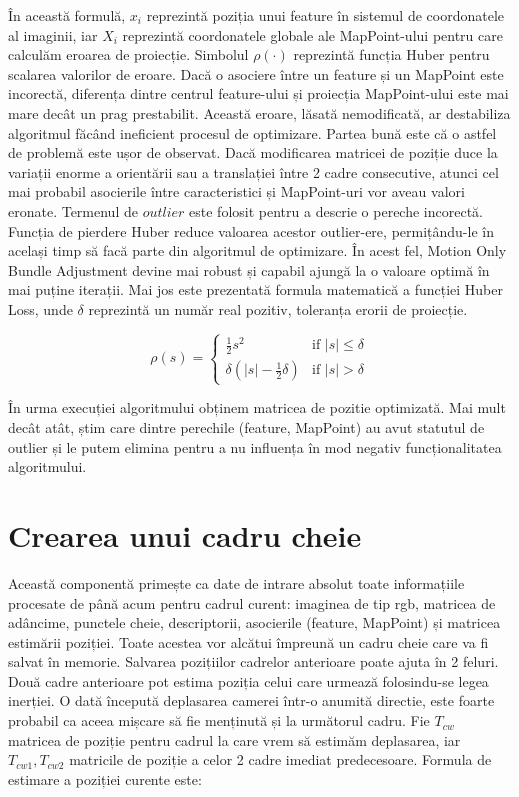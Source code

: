 \documentclass[12pt,a4paper]{report}
\begin{document}
În această formulă, \(x_i\) reprezintă poziția unui feature în sistemul de 
coordonatele al imaginii, iar \(X_i\) reprezintă coordonatele globale ale MapPoint-ului pentru care calculăm eroarea
de proiecție. Simbolul $ \rho(\cdot) $ reprezintă funcția Huber\cite{huber1964} pentru scalarea valorilor de eroare.
Dacă o asociere între un feature și un MapPoint este incorectă, diferența dintre centrul feature-ului
și proiecția MapPoint-ului este mai mare decât un prag prestabilit. Această eroare, lăsată nemodificată,
ar destabiliza algoritmul făcând ineficient procesul de optimizare. Partea bună este că o astfel de problemă
este ușor de observat. Dacă modificarea matricei de poziție duce la variații enorme a orientării sau a translației
între 2 cadre consecutive, atunci cel mai probabil asocierile între caracteristici și MapPoint-uri vor aveau valori eronate. 
Termenul de \(outlier\) este folosit pentru a descrie o pereche incorectă. Funcția de pierdere Huber reduce 
valoarea acestor outlier-ere, permițându-le în același timp să facă parte din algoritmul de 
optimizare. În acest fel, Motion Only Bundle Adjustment devine mai robust și capabil ajungă la o valoare optimă 
în mai puține iterații. Mai jos este prezentată formula matematică a funcției Huber Loss, 
unde $ \delta $ reprezintă un număr real pozitiv, toleranța erorii de proiecție. 

\begin{equation}
\rho(s) =
\begin{cases}
\frac{1}{2}s^2 & \text{if } |s| \leq \delta \\
\delta (|s| - \frac{1}{2}\delta) & \text{if } |s| > \delta
\end{cases}
\end{equation}

În urma execuției algoritmului obținem matricea de pozitie optimizată. Mai mult decât atât,
știm care dintre perechile (feature, MapPoint) au avut statutul de outlier și le putem 
elimina pentru a nu influența în mod negativ funcționalitatea algoritmului.

\section{Crearea unui cadru cheie}
Această componentă primește ca date de intrare absolut toate informațiile procesate de 
până acum pentru cadrul curent: imaginea de tip rgb, matricea de adâncime, punctele cheie,
descriptorii, asocierile (feature, MapPoint) și matricea estimării poziției. 
Toate acestea vor alcătui împreună un cadru cheie care va fi salvat în memorie.
Salvarea pozițiilor cadrelor anterioare poate ajuta în 2 feluri. Două cadre anterioare pot 
estima poziția celui care urmează folosindu-se legea inerției. O dată începută deplasarea 
camerei într-o anumită directie, este foarte probabil ca aceea mișcare să fie menținută și 
la următorul cadru. Fie \(T_{cw}\) matricea de poziție pentru cadrul la care vrem să estimăm
deplasarea, iar \(T_{cw1}, T_{cw2} \) matricile de poziție a celor 2 cadre imediat predecesoare.
Formula de estimare a poziției curente este:
\end{document}
